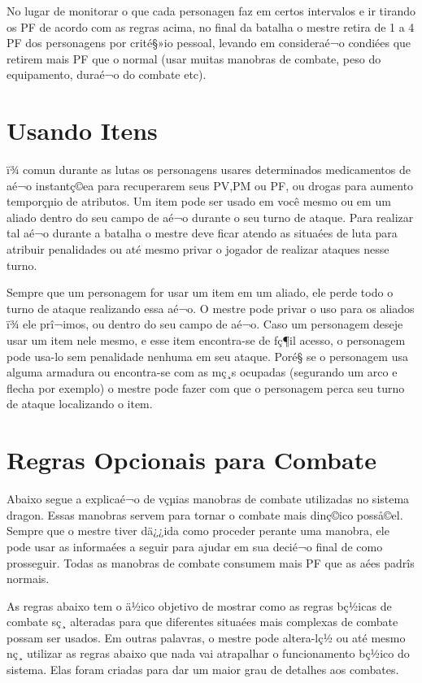 No lugar de monitorar o que cada personagen faz em certos intervalos e ir tirando os PF de acordo com as regras acima, no final da batalha o mestre retira de 1 a 4 PF dos personagens por crité§»io pessoal, levando em consideraé¬o condiées que retirem mais PF que o normal (usar muitas manobras de combate, peso do equipamento, duraé¬o do combate etc).


\section{Usando Itens}

ï¾ comun durante as lutas os personagens usares determinados medicamentos de aé¬o instantç©ea para recuperarem seus PV,PM ou PF, ou drogas para aumento temporçµio de atributos. Um item pode ser usado em você mesmo ou em um aliado dentro do seu campo de aé¬o durante o seu turno de ataque. Para realizar tal aé¬o durante a batalha o mestre deve ficar atendo as situaées de luta para atribuir penalidades ou até mesmo privar o jogador de realizar ataques nesse turno. 

Sempre que um personagem for usar um item em um aliado, ele perde todo o turno de ataque realizando essa aé¬o. O mestre pode privar o uso para os aliados ï¾ ele prî¬imos, ou dentro do seu campo de aé¬o. Caso um personagem deseje usar um item nele mesmo, e esse item encontra-se de fç¶il acesso, o personagem pode usa-lo sem penalidade nenhuma em seu ataque. Poré§ se o personagem usa alguma armadura ou encontra-se com as mç¸s ocupadas (segurando um arco e flecha por exemplo) o mestre pode fazer com que o personagem perca seu turno de ataque localizando o item.

 

\section{Regras Opcionais para Combate}

Abaixo segue a explicaé¬o de vçµias manobras de combate utilizadas no sistema dragon. Essas manobras servem para tornar o combate mais dinç©ico posså©el. Sempre que o mestre tiver dä¿¿ida como proceder perante uma manobra, ele pode usar as informaées a seguir para ajudar em sua decié¬o final de como prosseguir. Todas as manobras de combate consumem mais PF que as aées padrîs normais. 

As regras abaixo tem o ä½ico objetivo de mostrar como as regras bç½icas de combate sç¸ alteradas para que diferentes situaées mais complexas de combate possam ser usados. Em outras palavras, o mestre pode altera-lç½ ou até mesmo nç¸ utilizar as regras abaixo que nada vai atrapalhar o funcionamento bç½ico do sistema. Elas foram criadas para dar um maior grau de detalhes aos combates.
	
